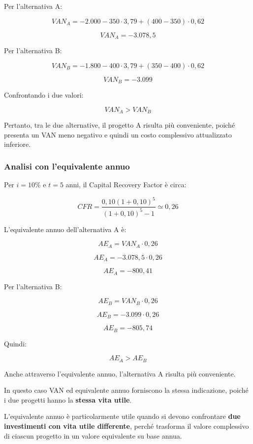 \noindent Per l'alternativa A:

\[
VAN_A =
-2.000
-350 \cdot 3,79
+(400-350)\cdot0,62
\]

\[
\boxed{VAN_A=-3.078,5}
\]

\noindent Per l'alternativa B:

\[
VAN_B =
-1.800
-400 \cdot 3,79
+(350-400)\cdot0,62
\]

\[
\boxed{VAN_B=-3.099}
\]

\noindent Confrontando i due valori:

\[
\boxed{VAN_A > VAN_B}
\]

\noindent Pertanto, tra le due alternative, il progetto A risulta più conveniente,
poiché presenta un VAN meno negativo e quindi un costo complessivo attualizzato
inferiore.

\subsubsection*{Analisi con l'equivalente annuo}

\noindent Per $i=10\%$ e $t=5$ anni, il Capital Recovery Factor è circa:

\[
CFR =
\frac{0,10(1+0,10)^5}
{(1+0,10)^5-1}
\simeq 0,26
\]

\noindent L'equivalente annuo dell'alternativa A è:

\[
AE_A = VAN_A \cdot 0,26
\]

\[
AE_A = -3.078,5 \cdot 0,26
\]

\[
\boxed{AE_A=-800,41}
\]

\noindent Per l'alternativa B:

\[
AE_B = VAN_B \cdot 0,26
\]

\[
AE_B = -3.099 \cdot 0,26
\]

\[
\boxed{AE_B=-805,74}
\]

\noindent Quindi:

\[
\boxed{AE_A > AE_B}
\]

\noindent Anche attraverso l'equivalente annuo, l'alternativa A risulta
più conveniente.

\medskip

\noindent In questo caso VAN ed equivalente annuo forniscono la stessa indicazione,
poiché i due progetti hanno la \textbf{stessa vita utile}.

\medskip

\noindent L'equivalente annuo è particolarmente utile quando si devono confrontare
\textbf{due investimenti con vita utile differente}, perché trasforma il valore
complessivo di ciascun progetto in un valore equivalente su base annua.

